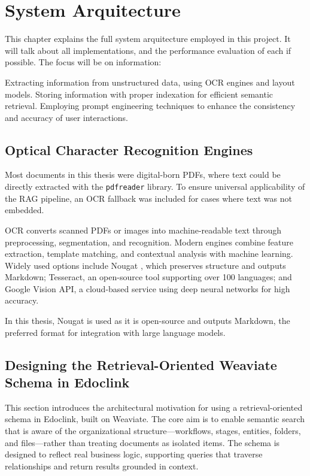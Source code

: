\chapter{System Arquitecture}
\label{chapter:System_Arquitecture}
This chapter explains the full system arquitecture employed in this project. It will talk about all implementations, and the performance evaluation of each if possible. The focus will be on information:

Extracting information from unstructured data, using OCR engines and layout models.
Storing information with proper indexation for efficient semantic retrieval.
Employing prompt engineering techniques to enhance the consistency and accuracy of user interactions. 

\section{Optical Character Recognition Engines}
\label{sec:ocr}
Most documents in this thesis were digital-born PDFs, where text could be directly extracted with the \texttt{pdfreader} library. To ensure universal applicability of the RAG pipeline, an OCR fallback was included for cases where text was not embedded. 

OCR converts scanned PDFs or images into machine-readable text through preprocessing, segmentation, and recognition. Modern engines combine feature extraction, template matching, and contextual analysis with machine learning. Widely used options include Nougat \cite{blecher2023nougatneuralopticalunderstanding}, which preserves structure and outputs Markdown; Tesseract, an open-source tool supporting over 100 languages; and Google Vision API, a cloud-based service using deep neural networks for high accuracy.

In this thesis, Nougat is used as it is open-source and outputs Markdown, the preferred format for integration with large language models.



\section{Designing the Retrieval-Oriented Weaviate Schema in Edoclink}
\label{sec:schema}

This section introduces the architectural motivation for using a retrieval-oriented schema in Edoclink, built on Weaviate. The core aim is to enable semantic search that is aware of the organizational structure—workflows, stages, entities, folders, and files—rather than treating documents as isolated items. The schema is designed to reflect real business logic, supporting queries that traverse relationships and return results grounded in context.

